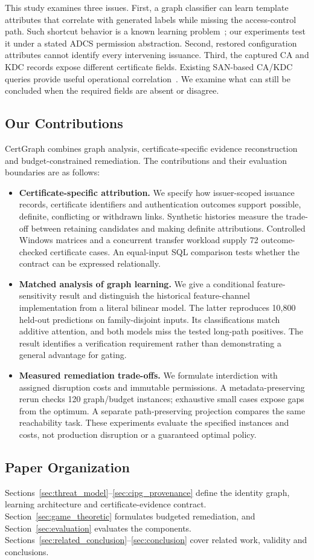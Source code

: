 This study examines three issues. First, a graph classifier can learn template attributes that correlate with generated labels while missing the access-control path. Such shortcut behavior is a known learning problem~\cite{geirhos2020shortcut}; our experiments test it under a stated ADCS permission abstraction. Second, restored configuration attributes cannot identify every intervening issuance. Third, the captured CA and KDC records expose different certificate fields. Existing SAN-based CA/KDC queries provide useful operational correlation~\cite{insecurity2023adcs,splunk2026esc1}. We examine what can still be concluded when the required fields are absent or disagree.

\subsection{Our Contributions}
CertGraph combines graph analysis, certificate-specific evidence reconstruction and budget-constrained remediation. The contributions and their evaluation boundaries are as follows:

\begin{itemize}
\item \textbf{Certificate-specific attribution.} We specify how issuer-scoped issuance records, certificate identifiers and authentication outcomes support possible, definite, conflicting or withdrawn links. Synthetic histories measure the trade-off between retaining candidates and making definite attributions. Controlled Windows matrices and a concurrent transfer workload supply 72 outcome-checked certificate cases. An equal-input SQL comparison tests whether the contract can be expressed relationally.
\item \textbf{Matched analysis of graph learning.} We give a conditional feature-sensitivity result and distinguish the historical feature-channel implementation from a literal bilinear model. The latter reproduces 10,800 held-out predictions on family-disjoint inputs. Its classifications match additive attention, and both models miss the tested long-path positives. The result identifies a verification requirement rather than demonstrating a general advantage for gating.
\item \textbf{Measured remediation trade-offs.} We formulate interdiction with assigned disruption costs and immutable permissions. A metadata-preserving rerun checks 120 graph/budget instances; exhaustive small cases expose gaps from the optimum. A separate path-preserving projection compares the same reachability task. These experiments evaluate the specified instances and costs, not production disruption or a guaranteed optimal policy.
\end{itemize}

\subsection{Paper Organization}
Sections~\ref{sec:threat_model}--\ref{sec:cipg_provenance} define the identity graph, learning architecture and certificate-evidence contract. Section~\ref{sec:game_theoretic} formulates budgeted remediation, and Section~\ref{sec:evaluation} evaluates the components. Sections~\ref{sec:related_conclusion}--\ref{sec:conclusion} cover related work, validity and conclusions.
